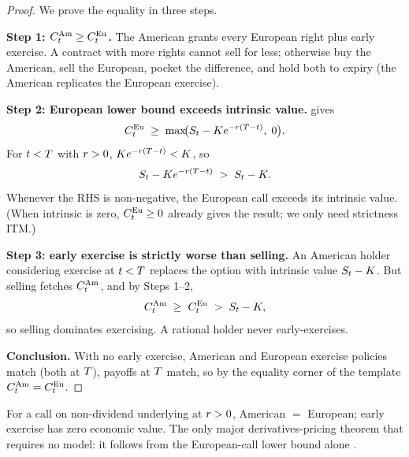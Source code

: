 \begin{proof}
We prove the equality in three steps.

\textbf{Step 1: $C^{\mathrm{Am}}_t \geq C^{\mathrm{Eu}}_t$.}
The American grants every European right plus early exercise.
A contract with more rights cannot sell for less; otherwise buy
the American, sell the European, pocket the difference, and hold
both to expiry (the American replicates the European exercise).

\textbf{Step 2: European lower bound exceeds intrinsic value.}
 gives
\begin{equation*}
  C^{\mathrm{Eu}}_t \;\geq\;
    \max\!\bigl(S_t - K e^{-r(T - t)},\; 0\bigr).
\end{equation*}
For $t < T$ with $r > 0$, $K e^{-r(T-t)} <
K$, so
\begin{equation*}
  S_t - K e^{-r(T - t)}
  \;>\; S_t - K.
\end{equation*}
Whenever the RHS is non-negative, the European call exceeds its
intrinsic value. (When intrinsic is zero, $C^{\mathrm{Eu}}_t
\geq 0$ already gives the result; we only need strictness ITM.)

\textbf{Step 3: early exercise is strictly worse than selling.}
An American holder considering exercise at $t < T$ replaces
the option with intrinsic value $S_t - K$. But selling
fetches $C^{\mathrm{Am}}_t$, and by Steps 1--2,
\begin{equation*}
  C^{\mathrm{Am}}_t \;\geq\; C^{\mathrm{Eu}}_t
       \;>\; S_t - K,
\end{equation*}
so selling dominates exercising. A rational holder never
early-exercises.

\textbf{Conclusion.} With no early exercise, American and
European exercise policies match (both at $T$), payoffs at
$T$ match, so by the equality corner of the template
$C^{\mathrm{Am}}_t = C^{\mathrm{Eu}}_t$.
\end{proof}

\begin{keyfactbox}
\label{kf:american_call}
For a call on non-dividend underlying at $r > 0$, American
$=$ European; early exercise has zero economic value. The only
major derivatives-pricing theorem that requires no model: it
follows from the European-call lower bound alone
\citep{merton1973rational}.
\end{keyfactbox}

